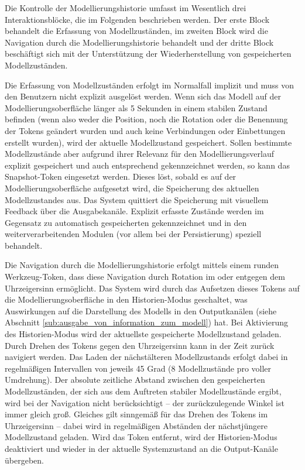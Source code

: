 Die Kontrolle der Modellierungshistorie umfasst im Wesentlich drei Interaktionsblöcke, die im Folgenden beschrieben werden. Der erste Block behandelt die Erfassung von Modellzuständen, im zweiten Block wird die Navigation durch die Modellierungshistorie behandelt und der dritte Block beschäftigt sich mit der Unterstützung der Wiederherstellung von gespeicherten Modellzuständen.

Die Erfassung von Modellzuständen erfolgt im Normalfall implizit und muss von den Benutzern nicht explizit ausgelöst werden. Wenn sich das Modell auf der Modellierungsoberfläche länger als 5 Sekunden in einem stabilen Zustand befinden (wenn also weder die Position, noch die Rotation oder die Benennung der Tokens geändert wurden und auch keine Verbindungen oder Einbettungen erstellt wurden), wird der aktuelle Modellzustand gespeichert. Sollen bestimmte Modellzustände aber aufgrund ihrer Relevanz für den Modellierungsverlauf explizit gespeichert und auch entsprechend gekennzeichnet werden, so kann das Snapshot-Token eingesetzt werden. Dieses löst, sobald es auf der Modellierungsoberfläche aufgesetzt wird, die Speicherung des aktuellen Modellzustandes aus. Das System quittiert die Speicherung mit visuellem Feedback über die Ausgabekanäle. Explizit erfasste Zustände werden im Gegensatz zu automatisch gespeicherten gekennzeichnet und in den weiterverarbeitenden Modulen (vor allem bei der Persistierung) speziell behandelt.

Die Navigation durch die Modellierungshistorie erfolgt mittels einem runden Werkzeug-Token, dass diese Navigation durch Rotation im oder entgegen dem Uhrzeigersinn ermöglicht. Das System wird durch das Aufsetzen dieses Tokens auf die Modellierungsoberfläche in den Historien-Modus geschaltet, was Auswirkungen auf die Darstellung des Modells in den Outputkanälen (siehe Abschnitt \ref{sub:ausgabe_von_information_zum_modell}) hat. Bei Aktivierung des Historien-Modus wird der aktuellste gespeicherte Modellzustand geladen. Durch Drehen des Tokens gegen den Uhrzeigersinn kann in der Zeit zurück navigiert werden. Das Laden der nächstälteren Modellzustands erfolgt dabei in regelmäßigen Intervallen von jeweils 45 Grad (8 Modellzustände pro voller Umdrehung). Der absolute zeitliche Abstand zwischen den gespeicherten Modellzuständen, der sich aus dem Auftreten stabiler Modellzustände ergibt, wird bei der Navigation nicht berücksichtigt -- der zurückzulegende Winkel ist immer gleich groß. Gleiches gilt sinngemäß für das Drehen des Tokens im Uhrzeigersinn -- dabei wird in regelmäßigen Abständen der nächstjüngere Modellzustand geladen. Wird das Token entfernt, wird der Historien-Modus deaktiviert und wieder in der aktuelle Systemzustand an die Output-Kanäle übergeben.

